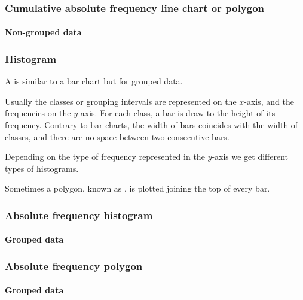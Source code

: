 \begin{frame}
\frametitle{Cumulative absolute frequency line chart or polygon}
\framesubtitle{Non-grouped data}
\begin{center}
\scalebox{0.6}{} 
\end{center} 
\end{frame}


\begin{frame}
\frametitle{Histogram}
A  is similar to a bar chart but for grouped data.  

Usually the classes or grouping intervals are represented on the $x$-axis, and the frequencies on the $y$-axis. 
For each class, a bar is draw to the height of its frequency.
Contrary to bar charts, the width of bars coincides with the width of classes, and there are no space between two consecutive bars.

Depending on the type of frequency represented in the $y$-axis we get different types of histograms.
 
Sometimes a polygon, known as , is plotted joining the top of every bar.
\end{frame}


\begin{frame}
\frametitle{Absolute frequency histogram}
\framesubtitle{Grouped data}
\begin{center}
\scalebox{0.6}{}
\end{center} 
\end{frame}


\begin{frame}
\frametitle{Absolute frequency polygon}
\framesubtitle{Grouped data}
\begin{center}
\scalebox{0.6}{} 
\end{center} 
\end{frame}

